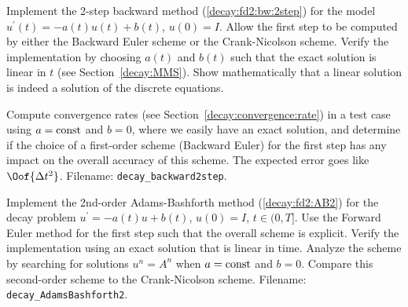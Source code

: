 \documentclass[graybox,sectrefs,envcountresetchap,open=right,final]{svmonodo}
\makeatletter
\newenvironment{doconceexercise}{}{}
\newcounter{doconceexercisecounter}%
\newcommand\listofexercises{
\chapter*{List of Exercises, Problems, and Projects
          \@mkboth{List of Exercises, Problems, and Projects}{List of Exercises, Problems, and Projects}}
\markboth{List of Exercises, Problems, and Projects}{List of Exercises, Problems, and Projects}
\@starttoc{loe}
}
\makeatother
\begin{document}
\begin{doconceexercise}

                
\label{decay:fd2:exer:bw2}

Implement the 2-step backward method (\ref{decay:fd2:bw:2step}) for the
model $u^{\prime}(t) = -a(t)u(t) + b(t)$, $u(0)=I$.  Allow the first step to
be computed by either the Backward Euler scheme or the Crank-Nicolson
scheme. Verify the implementation by choosing $a(t)$ and $b(t)$ such
that the exact solution is linear in $t$ (see Section~\ref{decay:MMS}). Show mathematically that a linear solution is indeed a
solution of the discrete equations.

Compute convergence rates (see Section~\ref{decay:convergence:rate}) in
a test case using $a=\hbox{const}$ and $b=0$, where we easily have an exact
solution, and determine if the choice of a first-order scheme
(Backward Euler) for the first step has any impact on the overall
accuracy of this scheme. The expected error goes like $\Oof{\Delta t^2}$.
\noindent Filename: \Verb!decay_backward2step!.

\end{doconceexercise}

\begin{doconceexercise}

                
\label{decay:fd2:exer:AB2}

Implement the 2nd-order Adams-Bashforth method (\ref{decay:fd2:AB2})
for the decay problem $u^{\prime}=-a(t)u + b(t)$, $u(0)=I$, $t\in (0, T]$.
Use the Forward Euler method for the first step such that the overall
scheme is explicit. Verify the implementation using an exact
solution that is linear in time.
Analyze the scheme by searching for solutions $u^n=A^n$ when $a=\hbox{const}$
and $b=0$. Compare this second-order scheme to the Crank-Nicolson scheme.
\noindent Filename: \Verb!decay_AdamsBashforth2!.

\end{doconceexercise}
\end{document}
